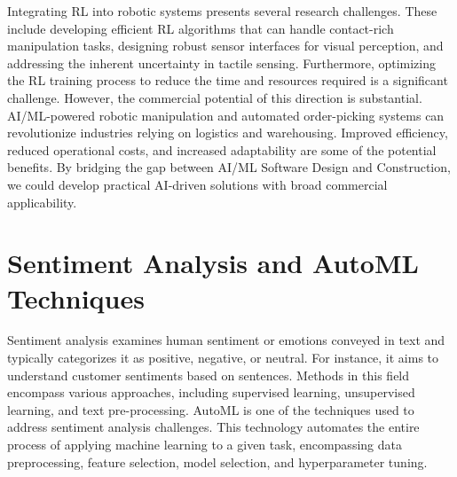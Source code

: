 \documentclass[11pt]{article}
\begin{document}
Integrating RL into robotic systems presents several research challenges. These include developing efficient RL algorithms that can handle contact-rich manipulation tasks, designing robust sensor interfaces for visual perception, and addressing the inherent uncertainty in tactile sensing. Furthermore, optimizing the RL training process to reduce the time and resources required is a significant challenge. However, the commercial potential of this direction is substantial. AI/ML-powered robotic manipulation and automated order-picking systems can revolutionize industries relying on logistics and warehousing. Improved efficiency, reduced operational costs, and increased adaptability are some of the potential benefits. By bridging the gap between AI/ML Software Design and Construction, we could develop practical AI-driven solutions with broad commercial applicability.

\section*{Sentiment Analysis and AutoML Techniques}

Sentiment analysis examines human sentiment or emotions conveyed in text and typically categorizes it as positive, negative, or neutral. For instance, it aims to understand customer sentiments based on sentences. Methods in this field encompass various approaches, including supervised learning, unsupervised learning, and text pre-processing. AutoML is one of the techniques used to address sentiment analysis challenges. This technology automates the entire process of applying machine learning to a given task, encompassing data preprocessing, feature selection, model selection, and hyperparameter tuning.
\end{document}
